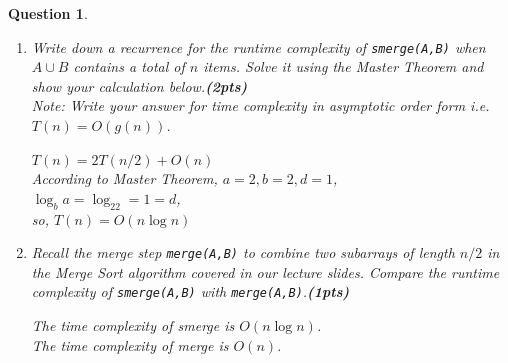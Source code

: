 \documentclass{article}
\newtheorem{Q}{Question}
\begin{document}
\begin{Q}
\begin{enumerate}[1.]
		      \textbf{Pseudocode}:
		      \begin{algorithm}[H]
			      \begin{algorithmic}[1]
				      \State s = t = 0
				      \State s++
				      \Else
				      \State t++
				      \EndIf
				      \EndWhile

			      \end{algorithmic}
		      \end{algorithm}
		      \textbf{Time Complexity Analysis}:\\
		      $T(n)=O(n/2)=O(n)$

		      \vspace{1.5cm}
		\item Write down a recurrence for the runtime complexity of \texttt{smerge(A,B)} when $A \cup B$ contains a total of $n$ items. Solve it using the Master Theorem and show your calculation below.\textbf{(2pts)}\\
		      Note: Write your answer for time complexity in asymptotic order form i.e. $T(n)=O(g(n))$.

		      $T(n)=2T(n/2)+O(n)$\\
		      According to Master Theorem, $a=2,b=2,d=1$,\\
		      $\log_ba=\log_22=1=d$,\\
		      so, $T(n)=O(n\log n)$
		      \vspace{1.5cm}
		\item Recall the merge step \texttt{merge(A,B)} to combine two subarrays of length $n/2$ in the Merge Sort algorithm covered in our lecture slides. Compare the runtime complexity of \texttt{smerge(A,B)} with \texttt{merge(A,B)}.\textbf{(1pts)}

		      The time complexity of smerge is $O(n\log n)$.\\
		      The time complexity of merge is $O(n)$.

		      \vspace{2.5cm}


\end{enumerate}
\end{Q}
\end{document}
